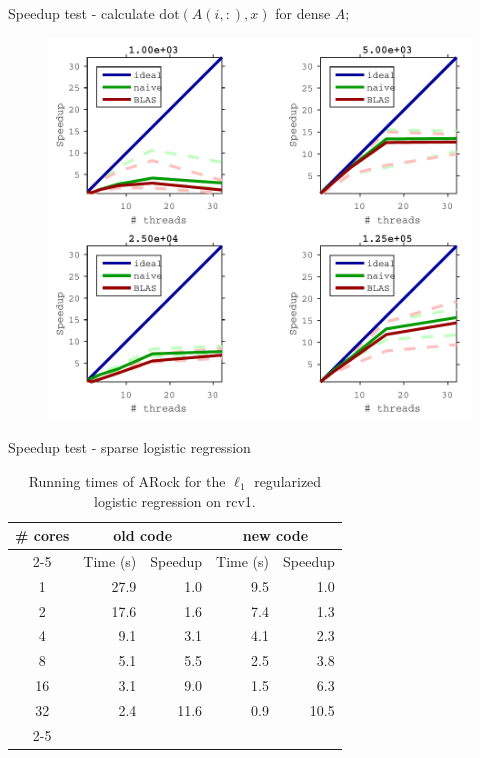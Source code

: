 \documentclass[hyperref,handout,compress,9pt,mathserif]{beamer}
\begin{document}
\begin{frame}{Speedup test - calculate $\text{dot}(A(i, :), x)$ for dense $A$;}
\begin{figure}[!h]
        \centering
                \includegraphics[width=.8\textwidth]{./figs/sp_mtx_ds_vec_speedup_cropped.pdf}
\end{figure}
\end{frame}




\begin{frame}{Speedup test - sparse logistic regression}
\begin{table}[htbp]
\centering
 {\small  \begin{tabular}{|c|r|r|r|r|}
  \hline
  \multirow{3}{*}{\# cores} & \multicolumn{2}{|c|}{old code} & \multicolumn{2}{c|}{new code} \\
  \cline{2-5}
  &Time (s) & Speedup & Time (s) & Speedup\\
  \hline
  1&27.9 & 1.0 & 9.5& 1.0\\
  2 &17.6& 1.6  &  7.4& 1.3\\
  4& 9.1& 3.1  & 4.1& 2.3\\
  8& 5.1 &5.5 & 2.5& 3.8\\
  16&3.1 &9.0 & 1.5&  6.3 \\
  32 &2.4 &11.6 & 0.9& 10.5\\
  \cline{2-5}
  \hline
  
  \hline
 \end{tabular} }
  \caption{\label{tab:log_time}Running times of  ARock for the $\ell_1$ regularized logistic regression on rcv1.}
 \end{table}


\end{frame}
\end{document}

